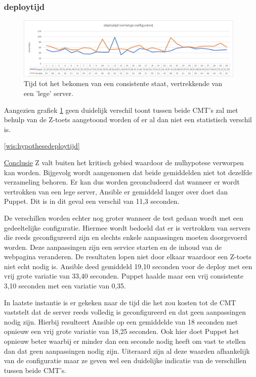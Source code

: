 \subsubsection{\gls{deploytijd}}
\begin{figure}
  \includegraphics[width=\linewidth]{img/deploytime_fullconfig.png} 
  \caption{Tijd tot het bekomen van een consistente staat, vertrekkende van een 'lege' server.}  
  \label{fig:deploytime_fullconfig}
\end{figure}

Aangezien grafiek \ref{fig:deploytime_fullconfig} geen duidelijk verschil toont tussen beide \gls{CMT}'s zal met behulp van de Z-toets aangetoond worden of er al dan niet een statistisch verschil is.

\ref{wis:hypothesedeploytijd}

\underline{Conclusie} \newline
Z valt buiten het kritisch gebied waardoor de nulhypotese verworpen kan worden. Bijgevolg wordt aangenomen dat beide gemiddelden niet tot dezelfde verzameling behoren. Er kan dus worden geconcludeerd dat wanneer er wordt vertrokken van een lege server, Ansible er gemiddeld langer over doet dan Puppet. Dit is in dit geval een verschil van 11,3 seconden. \newline

De verschillen worden echter nog groter wanneer de test gedaan wordt met een gedeeltelijke configuratie. Hiermee wordt bedoeld dat er is vertrokken van servers die reeds geconfigureerd zijn en slechts enkele aanpassingen moeten doorgevoerd worden. Deze aanpassingen zijn een service starten en de inhoud van de webpagina veranderen. De resultaten lopen niet door elkaar waardoor een Z-toets niet echt nodig is. Ansible deed gemiddeld 19,10 seconden voor de deploy met een vrij grote variatie van 33,40 seconden. Puppet haalde maar een vrij consistente 3,10 seconden met een variatie van 0,35. \newline

In laatste instantie is er gekeken naar de tijd die het zou kosten tot de \gls{CMT} vaststelt dat de server reeds volledig is geconfigureerd en dat geen aanpassingen nodig zijn. Hierbij resulteert Ansible op een gemiddelde van 18 seconden met opnieuw een vrij grote variatie van 18,25 seconden. Ook hier doet Puppet het opnieuw beter waarbij er minder dan een seconde nodig heeft om vast te stellen dan dat geen aanpassingen nodig zijn. Uiteraard zijn al deze waarden afhankelijk van de configuratie maar ze geven wel een duidelijke indicatie van de verschillen tussen beide \gls{CMT}'s.

